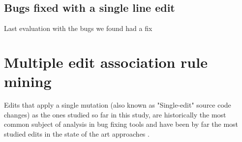 \documentclass[conference]{IEEEtran}
\newcommand{\ra}[1]{\renewcommand{\arraystretch}{#1}}
\begin{document}
\begin{table}\centering
\ra{1.3}
\ra{1.3}
		\caption{Single line bugs With Human Injected Fault Localization}\label{tab:singleLineBugs}
\end{table}



\subsection{Bugs fixed with a single line edit}
Last evaluation with the bugs we found had a fix




\section{Multiple edit association rule mining}

Edits that apply a single mutation (also known as "Single-edit" source code 
changes) as the ones studied so far in this study, are historically the most 
common subject of analysis in bug fixing tools and have been by far the most 
studied edits in the state of the art approaches 
\cite{Qi15,fan15,kim2013,Long2016,legoues12,Qi13,Qi14,xuan16}.
\end{document}
